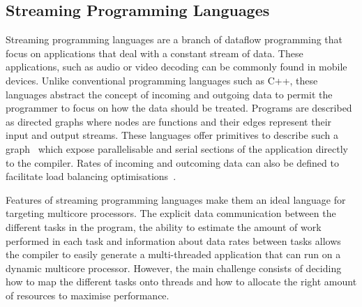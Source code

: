 \vspace{10mm}
\subsection{Streaming Programming Languages}


Streaming programming languages are a branch of dataflow programming that focus on applications that deal with a constant stream of data.
These applications, such as audio or video decoding can be commonly found in mobile devices.
Unlike conventional programming languages such as C++, these languages abstract the concept of incoming and outgoing data to permit the programmer to focus on how the data should be treated.
Programs are described as directed graphs where nodes are functions and their edges represent their input and output streams. 
These languages offer primitives to describe such a graph~\cite{theis2002streamit} which expose parallelisable and serial sections of the application directly to the compiler. 
Rates of incoming and outcoming data can also be defined to facilitate load balancing optimisations~\cite{chen2005rawstream}.

Features of streaming programming languages make them an ideal language for targeting multicore processors.
The explicit data communication between the different tasks in the program, the ability to estimate the amount of work performed in each task and information about data rates between tasks allows the compiler to easily generate a multi-threaded application that can run on a dynamic multicore processor.
However, the main challenge consists of deciding how to map the different tasks onto threads and how to allocate the right amount of resources to maximise performance.

